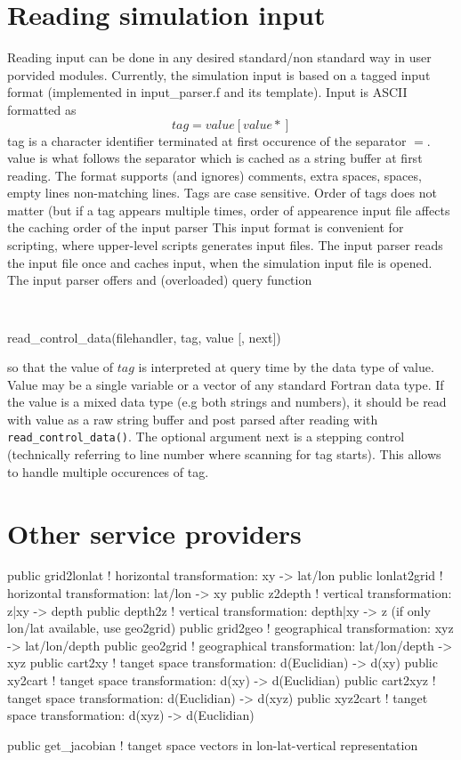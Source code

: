 \section{Reading simulation input}
Reading input can be done in any desired standard/non standard way
in user porvided modules. Currently, the simulation input is based on
a tagged input format (implemented in input\_parser.f and its 
template). Input is ASCII formatted as  
\begin{equation}
tag = value [value*] \nonumber
\end{equation}
tag is a character identifier terminated at first occurence of 
the separator $=$. value is what follows the separator which
is cached as a string buffer at first reading. 
The format supports (and ignores) comments, extra spaces, spaces, 
empty lines non-matching lines. Tags are case sensitive.
Order of tags does not matter (but if a tag appears multiple times,
order of appearence input file affects the caching order of the input parser
This input format is convenient for scripting, where upper-level  
scripts generates input files.
The input parser reads the input file once and caches input, when 
the simulation input file is opened. 
The input parser offers and (overloaded) query function
\begin{itemize}
{\tt 
\item read\_control\_data(filehandler, tag, value [, next]) 
}
\end{itemize}
so that the value of $tag$ is interpreted at query time by the
data type of value. Value may be a single variable or a vector
of any standard Fortran data type. If the value is a mixed
data type (e.g both strings and numbers), it should be read
with value as a raw string buffer and post parsed after reading
with {\tt read\_control\_data()}. The optional argument next
is a stepping control (technically referring to line number where scanning for 
tag starts). This allows to handle multiple occurences of tag.


\section{Other service providers}









public grid2lonlat  ! horizontal transformation:   xy            -> lat/lon
public lonlat2grid  ! horizontal transformation:   lat/lon       -> xy
public z2depth      ! vertical transformation:     z|xy          -> depth
public depth2z      ! vertical transformation:     depth|xy      -> z   (if only lon/lat available, use geo2grid)
public grid2geo     ! geographical transformation: xyz           -> lat/lon/depth
public geo2grid     ! geographical transformation: lat/lon/depth -> xyz 
public cart2xy      ! tanget space transformation: d(Euclidian)  -> d(xy)
public xy2cart      ! tanget space transformation: d(xy)         -> d(Euclidian)
public cart2xyz     ! tanget space transformation: d(Euclidian)  -> d(xyz)
public xyz2cart     ! tanget space transformation: d(xyz)        -> d(Euclidian)

public get_jacobian ! tanget space vectors in lon-lat-vertical representation 




